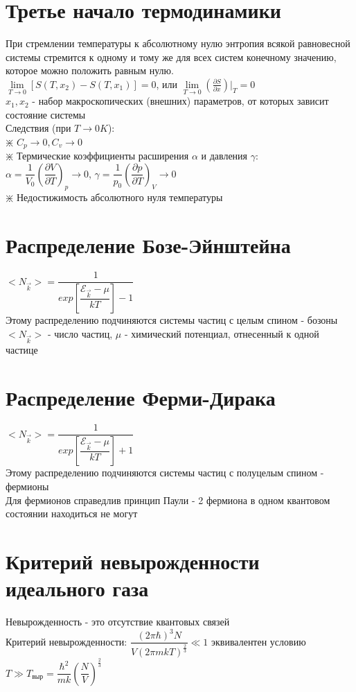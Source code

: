 \begin{multicols*}{2}
		\section{Третье начало термодинамики}
		При стремлении температуры к абсолютному  нулю энтропия всякой равновесной системы стремится к одному и тому же для всех систем конечному значению, которое можно положить равным нулю.\\
		$\lim\limits_{T\to 0} [ S(T, x_2) - S(T, x_1)] =0$, или $\lim\limits_{T\to 0} \left(\frac{\partial S}{\partial x}\right)\vert _T = 0$\\
		$x_1, x_2$ - набор макроскопических (внешних) параметров, от которых зависит состояние системы\\
		Следствия (при $T\rightarrow 0K$):\\
		$\divideontimes$ $C_p \rightarrow 0, C_v \rightarrow 0$\\
		$\divideontimes$ Термические коэффициенты расширения $\alpha$ и давления $\gamma$:\\
		$\alpha = \dfrac{1}{V_0}\left(\dfrac{\partial V}{\partial T}\right)_p \rightarrow 0$, \quad $\gamma = \dfrac{1}{p_0}\left(\dfrac{\partial p}{\partial T}\right)_V \rightarrow 0$\\
		$\divideontimes$ Недостижимость абсолютного нуля температуры

		\section{Распределение Бозе-Эйнштейна}
		$<N_{\vec{k}}> = \dfrac{1}{exp\left[\dfrac{\mathcal{E}_{\vec{k}} - \mu}{kT}\right] - 1}$\\
		Этому распределению подчиняются системы частиц с целым спином - бозоны\\
		$<N_{\vec{k}}>$ - число частиц, $\mu$ - химический потенциал, отнесенный к одной частице

		\section{Распределение Ферми-Дирака}
		$<N_{\vec{k}}> = \dfrac{1}{exp\left[\dfrac{\mathcal{E}_{\vec{k}} - \mu}{kT}\right] + 1}$\\
		Этому распределению подчиняются системы частиц с полуцелым спином - фермионы\\
		Для фермионов справедлив принцип Паули - 2 фермиона в одном квантовом состоянии находиться не могут

		\section{Критерий невырожденности идеального газа}
		Невырожденность - это отсутствие квантовых связей\\
		Критерий невырожденности: $\dfrac{(2\pi \hbar)^3 N}{V(2\pi mkT)^{\frac{2}{3}}} \ll 1$ эквивалентен условию $T\gg T_{\text{выр}} = \dfrac{\hbar^2}{mk} \left(\dfrac{N}{V}\right)^{\frac{2}{3}}$


\end{multicols*}
